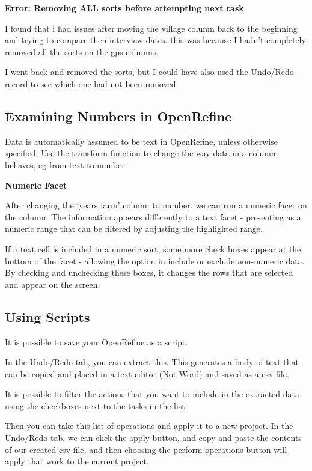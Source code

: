 \documentclass{article}
\begin{document}
\textbf{Error: Removing ALL sorts before attempting next task}
\label{Error: Removing ALL sorts before attempting next task}

I found that i had issues after moving the village column back to the beginning and trying to compare then interview dates. this was because I hadn't completely removed all the sorts on the gps columns. 

I went back and removed the sorts, but I could have also used the Undo/Redo record to see which one had not been removed.

\subsection{Examining Numbers in OpenRefine}

Data is automatically assumed to be text in OpenRefine, unless otherwise specified. Use the transform function to change the way data in a column behaves, eg from text to number.

\textbf{Numeric Facet}

After changing the `years farm' column to number, we can run  a numeric facet on the column. The information appears differently to a text facet - presenting as a numeric range that can be filtered by adjusting the highlighted range.

If a text cell is included in a numeric sort, some more check boxes appear at the bottom of the facet - allowing the option in include or exclude non-numeric data. By checking and unchecking these boxes, it changes the rows that are selected and appear on the screen.

\subsection{Using Scripts}

It is possible to save your OpenRefine as a script. 

In the Undo/Redo tab, you can extract this. This generates a body of text that can be copied and placed in a text editor (Not Word) and saved as a csv file. 

It is possible to filter the actions that you want to include in the extracted data using the checkboxes next to the tasks in the list.

Then you can take this list of operations and apply it to a new project. In the Undo/Redo tab, we can click the apply button, and copy and paste the contents of our created csv file, and then choosing the perform operations button will apply that work to the current project.
\end{document}
